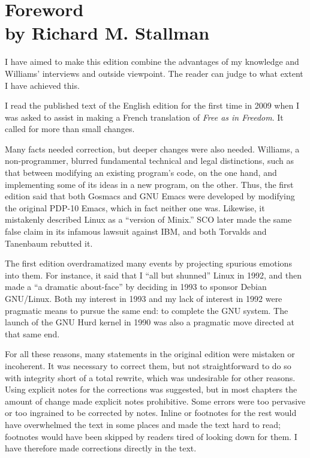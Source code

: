 

\chapter[Foreword by Richard M. Stallman]{Foreword\\by Richard M. Stallman}

I have aimed to make this edition combine the advantages of my
knowledge and Williams' interviews and outside viewpoint.  The reader
can judge to what extent I have achieved this.

I read the published text of the English edition for the first time in
2009 when I was asked to assist in making a French translation of \textit{Free
as in Freedom}.  It called for more than small changes.

Many facts needed correction, but deeper changes were also needed.
Williams, a non-programmer, blurred fundamental technical and legal
distinctions, such as that between modifying an existing program's
code, on the one hand, and implementing some of its ideas in a new
program, on the other.  Thus, the first edition said that both Gosmacs
and GNU Emacs were developed by modifying the original PDP-10 Emacs,
which in fact neither one was.  Likewise, it mistakenly
described Linux as a ``version of Minix.''  SCO later made the same
false claim in its infamous lawsuit against IBM, and both Torvalds and
Tanenbaum rebutted it.

The first edition overdramatized many events by projecting spurious
emotions into them.  For instance, it said that I ``all but shunned''
Linux in 1992, and then made a ``a dramatic about-face'' by deciding in
1993 to sponsor Debian GNU/Linux.  Both my interest in 1993 and my
lack of interest in 1992 were pragmatic means to pursue the same end:
to complete the GNU system.  The launch of the GNU Hurd kernel in 1990
was also a pragmatic move directed at that same end.

For all these reasons, many statements in the original edition were
mistaken or incoherent.  It was necessary to correct them, but not
straightforward to do so with integrity short of a total rewrite,
which was undesirable for other reasons.  Using explicit notes for the
corrections was suggested, but in most chapters the amount of change
made explicit notes prohibitive.  Some errors were too pervasive or
too ingrained to be corrected by notes.  Inline or footnotes for the
rest would have overwhelmed the text in some places and made the text
hard to read; footnotes would have been skipped by readers tired of
looking down for them.  I have therefore made corrections directly in
the text.

